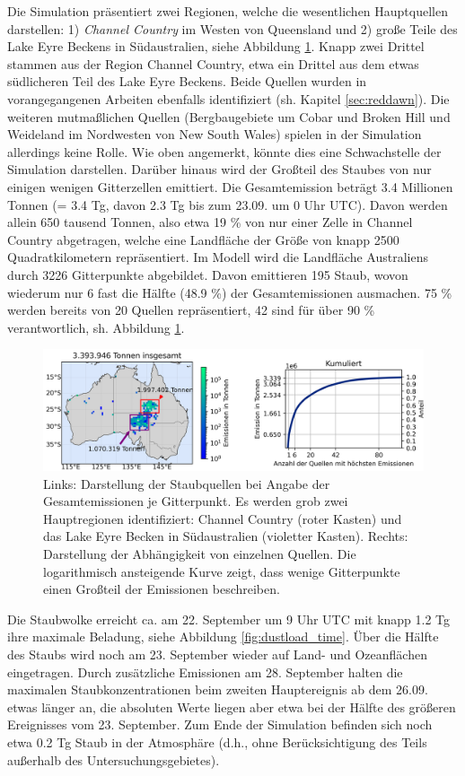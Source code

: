 \documentclass[12pt,a4paper,onecolumn,headheight=30pt]{scrartcl}
\begin{document}
Die Simulation präsentiert zwei Regionen, welche die wesentlichen Hauptquellen darstellen: 1) \textit{Channel Country} im Westen von Queensland und 2) große Teile des Lake Eyre Beckens in Südaustralien, siehe Abbildung \ref{fig:emissions}. Knapp zwei Drittel stammen aus der Region Channel Country, etwa ein Drittel aus dem etwas südlicheren Teil des Lake Eyre Beckens. Beide Quellen wurden in vorangegangenen Arbeiten ebenfalls identifiziert (sh. Kapitel \ref{sec:reddawn}). Die weiteren mutmaßlichen Quellen (Bergbaugebiete um Cobar und Broken Hill und Weideland im Nordwesten von New South Wales) spielen in der Simulation allerdings  keine Rolle. Wie oben angemerkt, könnte dies eine Schwachstelle der Simulation darstellen. Darüber hinaus wird der Großteil des Staubes von nur einigen wenigen Gitterzellen emittiert. Die Gesamtemission beträgt 3.4 Millionen Tonnen (= 3.4 Tg, davon 2.3 Tg bis zum 23.09. um 0 Uhr UTC). Davon werden allein 650 tausend Tonnen, also etwa 19 \% von nur einer Zelle in Channel Country abgetragen, welche eine Landfläche der Größe von knapp 2500 Quadratkilometern repräsentiert. Im Modell wird die Landfläche Australiens durch 3226 Gitterpunkte abgebildet. Davon emittieren 195 Staub, wovon wiederum nur 6 fast die Hälfte (48.9 \%) der Gesamtemissionen ausmachen. 75 \% werden bereits von 20 Quellen repräsentiert, 42 sind für über 90 \% verantwortlich, sh. Abbildung \ref{fig:emissions}. 
\begin{figure}[htbp]
\includegraphics[width=\textwidth]{bilder/emission_sections.png}
\caption{Links: Darstellung der Staubquellen bei Angabe der Gesamtemissionen je Gitterpunkt. Es werden grob zwei Hauptregionen identifiziert: Channel Country (roter Kasten) und das Lake Eyre Becken in Südaustralien (violetter Kasten). Rechts: Darstellung der Abhängigkeit von einzelnen Quellen. Die logarithmisch ansteigende Kurve zeigt, dass wenige Gitterpunkte einen Großteil der Emissionen beschreiben.} \label{fig:emissions}
\end{figure}
Die Staubwolke erreicht ca. am 22. September um 9 Uhr UTC mit knapp 1.2 Tg ihre maximale Beladung, siehe Abbildung \ref{fig:dustload_time}. Über die Hälfte des Staubs wird noch am 23. September wieder auf Land- und Ozeanflächen eingetragen. Durch zusätzliche Emissionen am 28. September halten die maximalen Staubkonzentrationen beim zweiten Hauptereignis ab dem 26.09. etwas länger an, die absoluten Werte liegen aber etwa bei der Hälfte des größeren Ereignisses vom 23. September. Zum Ende der Simulation befinden sich noch etwa 0.2 Tg Staub in der Atmosphäre (d.h., ohne Berücksichtigung des Teils außerhalb des Untersuchungsgebietes).
\end{document}

